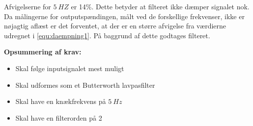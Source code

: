 \noindent 
Afvigelserne for $5~HZ$ er 14\%. Dette betyder at filteret ikke dæmper signalet nok. Da målingerne for outputspændingen, målt ved de forskellige frekvenser, ikke er nøjagtig aflæst er det forventet, at der er en større afvigelse fra værdierne udregnet i \autoref{equ:daempning1}. På baggrund af dette godtages filteret. 

\vspace{3mm}
\textbf{Opsummering af krav:}
\begin{itemize}
\item[\text{\sffamily \checkmark}] Skal følge inputsignalet mest muligt  
\item[\text{\sffamily \checkmark}] Skal udformes som et Butterworth lavpasfilter
\item[\text{\sffamily \checkmark}] Skal have en knækfrekvens på $5~Hz$
\item[\text{\sffamily \checkmark}] Skal have en filterorden på 2
\end{itemize}